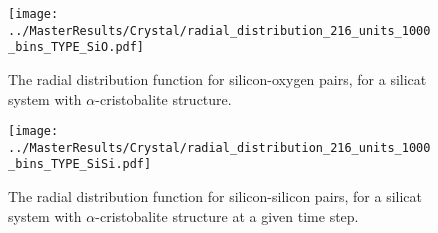 \begin{figure}[H]
 \centering
 \texttt{[image: ../MasterResults/Crystal/radial\_distribution\_216\_units\_1000\_bins\_TYPE\_SiO.pdf]}
 \caption{The radial distribution function for silicon-oxygen pairs, for a silicat system with $\alpha$-cristobalite structure.}
 \label{g_r_SiO}
\end{figure}

\begin{figure}[H]
 \centering
 \texttt{[image: ../MasterResults/Crystal/radial\_distribution\_216\_units\_1000\_bins\_TYPE\_SiSi.pdf]}
 \caption{The radial distribution function for silicon-silicon pairs, for a silicat system with $\alpha$-cristobalite structure at a given time step.}
 \label{g_r_SiSi}
\end{figure}


